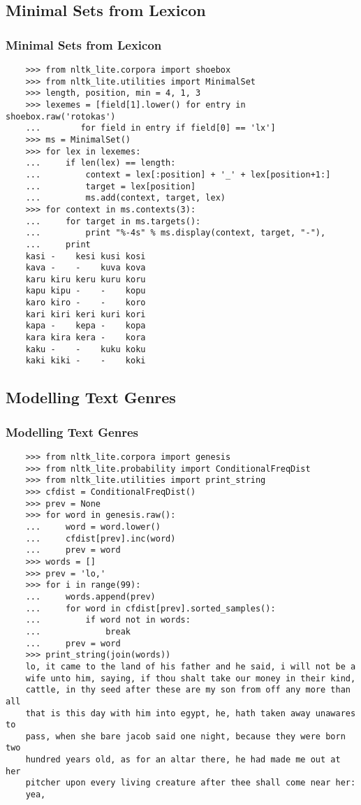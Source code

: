 \documentclass{beamer}             %
\begin{document}
\subsection{Minimal Sets from Lexicon}
\begin{frame}[fragile]
  \frametitle{Minimal Sets from Lexicon}
  \tiny
\begin{verbatim}
    >>> from nltk_lite.corpora import shoebox
    >>> from nltk_lite.utilities import MinimalSet
    >>> length, position, min = 4, 1, 3
    >>> lexemes = [field[1].lower() for entry in shoebox.raw('rotokas')
    ...		   for field in entry if field[0] == 'lx']
    >>> ms = MinimalSet()
    >>> for lex in lexemes:
    ...     if len(lex) == length:
    ...         context = lex[:position] + '_' + lex[position+1:]
    ...         target = lex[position]
    ...         ms.add(context, target, lex)
    >>> for context in ms.contexts(3):
    ...     for target in ms.targets():
    ...         print "%-4s" % ms.display(context, target, "-"),
    ...     print
    kasi -    kesi kusi kosi
    kava -    -    kuva kova
    karu kiru keru kuru koru
    kapu kipu -    -    kopu
    karo kiro -    -    koro
    kari kiri keri kuri kori
    kapa -    kepa -    kopa
    kara kira kera -    kora
    kaku -    -    kuku koku
    kaki kiki -    -    koki
\end{verbatim}
\end{frame}


\subsection{Modelling Text Genres}
\begin{frame}[fragile]
  \frametitle{Modelling Text Genres}
  \tiny
\begin{verbatim}
    >>> from nltk_lite.corpora import genesis
    >>> from nltk_lite.probability import ConditionalFreqDist
    >>> from nltk_lite.utilities import print_string
    >>> cfdist = ConditionalFreqDist()
    >>> prev = None
    >>> for word in genesis.raw():
    ...     word = word.lower()
    ...     cfdist[prev].inc(word)
    ...     prev = word
    >>> words = []
    >>> prev = 'lo,'
    >>> for i in range(99):
    ...     words.append(prev)
    ...     for word in cfdist[prev].sorted_samples():
    ...         if word not in words:
    ...             break
    ...     prev = word
    >>> print_string(join(words))
    lo, it came to the land of his father and he said, i will not be a
    wife unto him, saying, if thou shalt take our money in their kind,
    cattle, in thy seed after these are my son from off any more than all
    that is this day with him into egypt, he, hath taken away unawares to
    pass, when she bare jacob said one night, because they were born two
    hundred years old, as for an altar there, he had made me out at her
    pitcher upon every living creature after thee shall come near her:
    yea,
\end{verbatim}
\end{frame}
\end{document}
